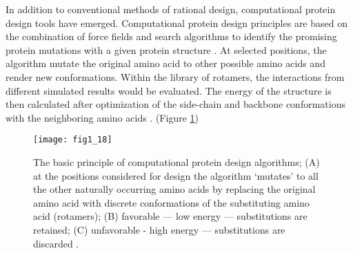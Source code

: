 \begin{refsection}
In addition to conventional methods of rational design, computational
protein design tools have emerged. Computational protein design principles
are based on the combination of force fields and search algorithms to
identify the promising protein mutations with a given protein structure
\cite{VanDerSloot2009a}. At selected positions, the algorithm mutate the
original amino acid to other possible amino acids and render new conformations.
Within the library of rotamers, the interactions from different simulated
results would be evaluated. The energy of the structure is then calculated
after optimization of the side-chain and backbone conformations with the
neighboring amino acids \cite{VanDerSloot2009a}. (Figure \ref{fig:cpd})
\begin{figure}[htbp] \centering \texttt{[image: fig1\_18]}
    \caption[The basic principle of computational protein design algorithms;
        (A) at the positions considered for design the algorithm ‘mutates’ to
        all the other naturally occurring amino acids by replacing the original
        amino acid with discrete conformations of the substituting amino acid
        (rotamers); (B) favorable — low energy — substitutions are retained;
        (C) unfavorable - high energy — substitutions are discarded.]{The basic
            principle of computational protein design algorithms; (A) at the
            positions considered for design the algorithm ‘mutates’ to all the
            other naturally occurring amino acids by replacing the original
            amino acid with discrete conformations of the substituting amino
            acid (rotamers); (B) favorable — low energy — substitutions are
            retained; (C) unfavorable - high energy — substitutions are
            discarded \cite{VanDerSloot2009a}.} 
    \label{fig:cpd} 
\end{figure}


\end{refsection}
